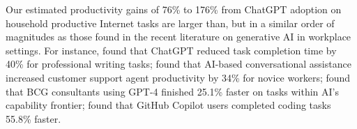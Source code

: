 \documentclass[12pt]{article}
\begin{document}

Our estimated productivity gains of 76\% to 176\% from ChatGPT adoption on household productive Internet tasks are larger than, but in a similar order of magnitudes as those found in the recent literature on generative AI in workplace settings. For instance, \citet{noy2023} found that ChatGPT reduced task completion time by 40\% for professional writing tasks; \citet{brynjolfsson2023} found that AI-based conversational assistance increased customer support agent productivity by 34\% for novice workers; \citet{dell2023} found that BCG consultants using GPT-4 finished 25.1\% faster on tasks within AI's capability frontier; \citet{peng2023} found that GitHub Copilot users completed coding tasks 55.8\% faster. 
\end{document}
